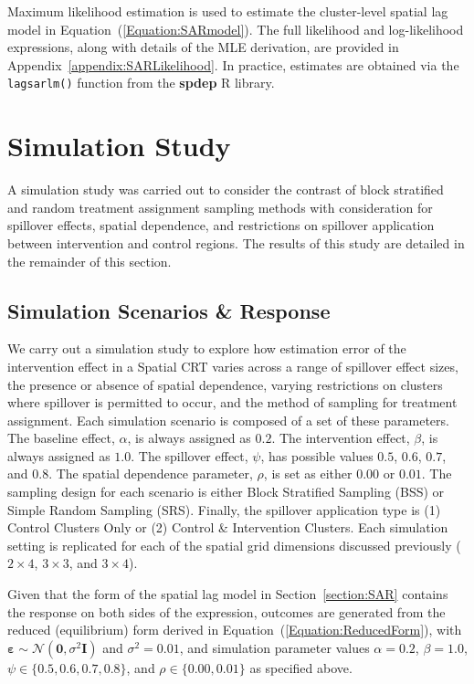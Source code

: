 \documentclass{article}[11pt]
\begin{document}
Maximum likelihood estimation is used to estimate the cluster-level spatial lag model in Equation~(\ref{Equation:SARmodel})\cite{ord_estimation_1975}\cite{bivand_comparing_2015}\cite{bivand_computing_2013}. The full likelihood and log-likelihood expressions, along with details of the MLE derivation, are provided in Appendix~\ref{appendix:SARLikelihood}. In practice, estimates are obtained via the \texttt{lagsarlm()} function from the \textbf{spdep} R library\cite{bivand_r_2022}.

\section{Simulation Study}\label{section:Results}

A simulation study was carried out to consider the contrast of block stratified and random treatment assignment sampling methods with consideration for spillover effects, spatial dependence, and restrictions on spillover application between intervention and control regions. The results of this study are detailed in the remainder of this section.

\subsection{Simulation Scenarios \& Response}

We carry out a simulation study to explore how estimation error of the intervention effect in a Spatial CRT varies across a range of spillover effect sizes, the presence or absence of spatial dependence, varying restrictions on clusters where spillover is permitted to occur, and the method of sampling for treatment assignment. Each simulation scenario is composed of a set of these parameters. The baseline effect, $\alpha$, is always assigned as $0.2$. The intervention effect, $\beta$, is always assigned as $1.0$. The spillover effect, $\psi$, has possible values $0.5$, $0.6$, $0.7$, and $0.8$. The spatial dependence parameter, $\rho$, is set as either $0.00$ or $0.01$. The sampling design for each scenario is either Block Stratified Sampling (BSS) or Simple Random Sampling (SRS). Finally, the spillover application type is (1) Control Clusters Only or (2) Control \& Intervention Clusters. Each simulation setting is replicated for each of the spatial grid dimensions discussed previously ($2\times4$, $3\times3$, and $3\times4$).

Given that the form of the spatial lag model in Section~\ref{section:SAR} contains the response on both sides of the expression, outcomes are generated from the reduced (equilibrium) form derived in Equation~(\ref{Equation:ReducedForm})\cite{fotheringham_sage_2009}\cite{baltagi_spatial_2003}, with $\boldsymbol\varepsilon \sim \mathcal{N}(\mathbf{0}, \sigma^2\mathbf{I})$ and $\sigma^2 = 0.01$, and simulation parameter values $\alpha = 0.2$, $\beta = 1.0$, $\psi \in \{0.5, 0.6, 0.7, 0.8\}$, and $\rho \in \{0.00, 0.01\}$ as specified above.
\end{document}
